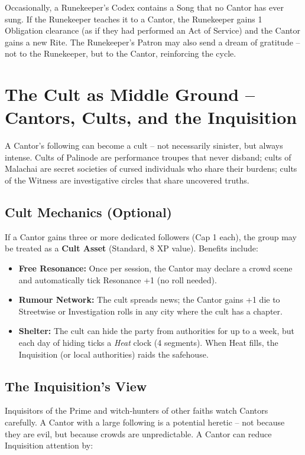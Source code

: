 \documentclass[10pt,a5paper]{book}
\begin{document}
Occasionally, a Runekeeper’s Codex contains a Song that no Cantor has ever sung. If the Runekeeper teaches it to a Cantor, the Runekeeper gains 1 Obligation clearance (as if they had performed an Act of Service) and the Cantor gains a new Rite. The Runekeeper’s Patron may also send a dream of gratitude – not to the Runekeeper, but to the Cantor, reinforcing the cycle.

\section{The Cult as Middle Ground – Cantors, Cults, and the Inquisition}

A Cantor’s following can become a cult – not necessarily sinister, but always intense. Cults of Palinode are performance troupes that never disband; cults of Malachai are secret societies of cursed individuals who share their burdens; cults of the Witness are investigative circles that share uncovered truths.

\subsection*{Cult Mechanics (Optional)}

If a Cantor gains three or more dedicated followers (Cap 1 each), the group may be treated as a \textbf{Cult Asset} (Standard, 8 XP value). Benefits include:

\begin{itemize}
    \item \textbf{Free Resonance:} Once per session, the Cantor may declare a crowd scene and automatically tick Resonance +1 (no roll needed).
    \item \textbf{Rumour Network:} The cult spreads news; the Cantor gains +1 die to Streetwise or Investigation rolls in any city where the cult has a chapter.
    \item \textbf{Shelter:} The cult can hide the party from authorities for up to a week, but each day of hiding ticks a \textit{Heat} clock (4 segments). When Heat fills, the Inquisition (or local authorities) raids the safehouse.
\end{itemize}

\subsection*{The Inquisition’s View}

Inquisitors of the Prime and witch‑hunters of other faiths watch Cantors carefully. A Cantor with a large following is a potential heretic – not because they are evil, but because crowds are unpredictable. A Cantor can reduce Inquisition attention by:
\end{document}
